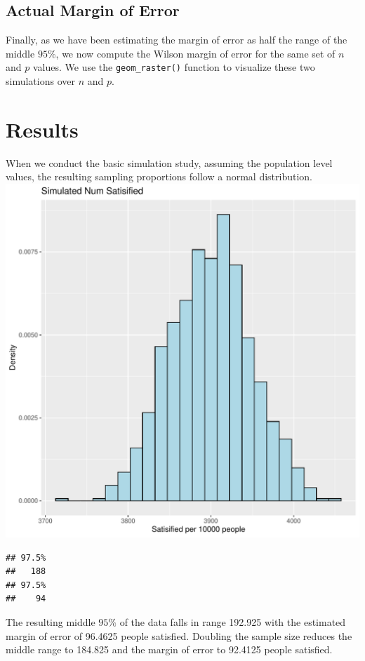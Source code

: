 \documentclass{article}\usepackage[]{graphicx}\usepackage[]{xcolor}
\makeatletter
\def\maxwidth{ %
  \ifdim\Gin@nat@width>\linewidth
    \linewidth
  \else
    \Gin@nat@width
  \fi
}
\newenvironment{kframe}{%
 \def\at@end@of@kframe{}%
 \ifinner\ifhmode%
  \def\at@end@of@kframe{\end{minipage}}%
  \begin{minipage}{\columnwidth}%
 \fi\fi%
 \def\FrameCommand##1{\hskip\@totalleftmargin \hskip-\fboxsep
 \colorbox{shadecolor}{##1}\hskip-\fboxsep
     \hskip-\linewidth \hskip-\@totalleftmargin \hskip\columnwidth}%
 \MakeFramed {\advance\hsize-\width
   \@totalleftmargin\z@ \linewidth\hsize
   \@setminipage}}%
 {\par\unskip\endMakeFramed%
 \at@end@of@kframe}
\newenvironment{knitrout}{}{} %
\makeatother
\begin{document}
\begin{multicols}{2}
\subsection{Actual Margin of Error}
Finally, as we have been estimating the margin of error as half the range of the middle $95\%$, we now compute the Wilson margin of error for the same set of $n$ and $p$ values. We use the \texttt{geom\_raster()} function to visualize these two simulations over $n$ and $p$.

\section{Results}
When we conduct the basic simulation study, assuming the population level values, the resulting sampling proportions follow a normal distribution.
\begin{knitrout}\scriptsize
{}\color{fgcolor}
\includegraphics[width=\maxwidth]{figure/unnamed-chunk-1-1} 
\begin{kframe}\begin{verbatim}
## 97.5% 
##   188
## 97.5% 
##    94
\end{verbatim}
\end{kframe}
\end{knitrout}
The resulting middle $95\%$ of the data falls in range 192.925 with the estimated margin of error of 96.4625 people satisfied. Doubling the sample size reduces the middle range to 184.825 and the margin of error to 92.4125 people satisfied. 


\end{multicols}
\end{document}
